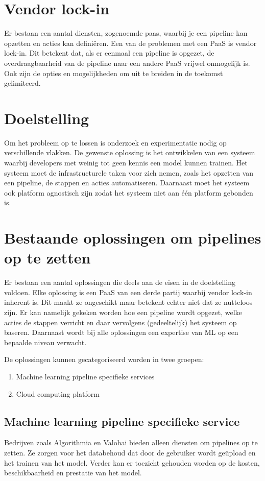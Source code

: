 \section{Vendor lock-in}\label{sec:vendor-lock-in}
Er bestaan een aantal diensten, zogenoemde \acrfull{paas}, waarbij je een pipeline kan opzetten en acties kan definiëren. Een van de problemen met een PaaS is vendor lock-in. Dit betekent dat, als er eenmaal een pipeline is opgezet, de overdraagbaarheid van de pipeline naar een andere PaaS vrijwel onmogelijk is. Ook zijn de opties en mogelijkheden om uit te breiden in de toekomst gelimiteerd.

\section{Doelstelling}\label{sec:doelstelling}
Om het probleem op te lossen is onderzoek en experimentatie nodig op verschillende vlakken. De gewenste oplossing is het ontwikkelen van een systeem waarbij developers met weinig tot geen kennis een model kunnen trainen. Het systeem moet de infrastructurele taken voor zich nemen, zoals het opzetten van een pipeline, de stappen en acties automatiseren. Daarnaast moet het systeem ook platform agnostisch zijn zodat het systeem niet aan één platform gebonden is.

\section{Bestaande oplossingen om pipelines op te zetten}\label{sec:bestaande-oplossingen-om-pipelines-op-te-zetten}
Er bestaan een aantal oplossingen die deels aan de eisen in de doelstelling voldoen. Elke oplossing is een PaaS van een derde partij waarbij vendor lock-in inherent is. Dit maakt ze ongeschikt maar betekent echter niet dat ze nutteloos zijn. Er kan namelijk gekeken worden hoe een pipeline wordt opgezet, welke acties de stappen verricht en daar vervolgens (gedeeltelijk) het systeem op baseren. Daarnaast wordt bij alle oplossingen een expertise van ML op een bepaalde niveau verwacht.

De oplossingen kunnen gecategoriseerd worden in twee groepen:
\begin{enumerate}
  \item Machine learning pipeline specifieke services
  \item Cloud computing platform
\end{enumerate}

\subsection{Machine learning pipeline specifieke service}\label{subsec:machine-learning-pipeline-specifieke-service}
Bedrijven zoals Algorithmia \cite{algorithmia-website} en Valohai \cite{valohai-website} bieden alleen diensten om pipelines op te zetten. Ze zorgen voor het databehoud dat door de gebruiker wordt geüpload en het trainen van het model. Verder kan er toezicht gehouden worden op de kosten, beschikbaarheid en prestatie van het model.

